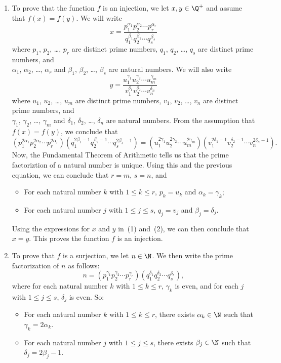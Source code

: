 \documentclass[11pt]{article}
\begin{document}
\begin{enumerate}
\item To prove that the function $f$ is an injection, we let $x, y \in \Q^+$ and assume that $f(x) = f(y)$.  We will write
\begin{equation}
x = \dfrac{p_1^{\alpha_1} p_2^{\alpha_2} \cdots p_r^{\alpha_r}}{q_1^{\beta_1} q_2^{\beta_2} \cdots q_s^{\beta_s}}
\end{equation}
where $p_1$, $p_2$, \ldots, $p_r$ are distinct prime numbers, $q_1$, $q_2$, \ldots, $q_s$ are distinct prime numbers, and \\
$\alpha_1$, $\alpha_2$, \ldots, $\alpha_r$ and $\beta_1$, $\beta_2$, \ldots, $\beta_s$ are natural numbers.   We will also write
\begin{equation}
y = \dfrac{u_1^{\gamma_1} u_2^{\gamma_2} \cdots u_m^{\gamma_m}}{v_1^{\delta_1} v_2^{\delta_2} \cdots v_n^{\delta_n}}
\end{equation}
where $u_1$, $u_2$, \ldots, $u_m$ are distinct prime numbers, $v_1$, $v_2$, \ldots, $v_n$ are distinct prime numbers, and \\
$\gamma_1$, $\gamma_2$, \ldots, $\gamma_m$ and $\delta_1$, $\delta_2$, \ldots, $\delta_n$ are natural numbers.  From the assumption that $f(x) = f(y)$, we conclude that
\[
\left( p_1^{2 \alpha_1} p_2^{2 \alpha_2} \cdots p_r^{2 \alpha_r} \right) \left( q_1^{2 \beta_1-1} q_2^{ \beta_2-1} \cdots q_s^{2 \beta_s-1} \right) = 
\left( u_1^{2 \gamma_1} u_2^{2 \gamma_2} \cdots u_m^{2 \gamma_m} \right) \left( v_1^{2 \delta_1-1} v_2^{ \delta_2-1} \cdots v_n^{2 \delta_n-1} \right).
\]
Now, the Fundamental Theorem of Arithmetic tells us that the prime factoriztion of a natural number is unique.  Using this and the previous equation, we can conclude that 
$r = m$, $s = n$, and 
\begin{itemize}
\item For each natural number $k$ with $1 \leq k \leq r$, $p_k = u_k$ and 
$\alpha_k = \gamma_k$;
\item For each natural number $j$ with $1 \leq j \leq s$, $q_j = v_j$ and 
$\beta_j = \delta_j$.
\end{itemize}
Using the expressions for $x$ and $y$ in~(1) and~(2), we can then conclude that $x = y$.  This proves the function $f$ is an injection.


\pagebreak
\item To prove that $f$ is a surjection, we let $n \in \N$.  We then write the prime factorization of $n$ as follows:
\[
n = \left( p_1^{\gamma_1} p_2^{\gamma_2} \cdots p_r^{\gamma_r} \right) \left( q_1^{\delta_1} q_2^{\delta_2} \cdots q_s^{\delta_s} \right),
\]
where for each natural number $k$ with $1 \leq k \leq r$, $\gamma_k$ is even, and for each $j$ with $1 \leq j \leq s$, $\delta_j$ is even.  So:
\begin{itemize}
\item For each natural number $k$ with 
$1 \leq k \leq r$, there exists $\alpha_k \in \N$ such that $\gamma_k = 2 \alpha_k$.
\item For each natural number $j$ with 
$1 \leq j \leq s$, there exists $\beta_j \in \N$ such that $\delta_j = 2 \beta_j - 1$.
\end{itemize}


\end{enumerate}
\end{document}
